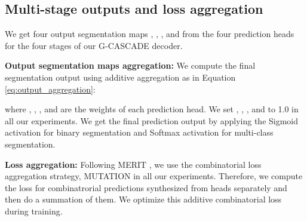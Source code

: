 \documentclass[10pt,twocolumn,letterpaper]{article}
\begin{document}
\subsection{Multi-stage outputs and loss aggregation}
We get four output segmentation maps , , , and  from the four prediction heads for the four stages of our G-CASCADE decoder. 

\textbf{Output segmentation maps aggregation:} We compute the final segmentation output using additive aggregation as in Equation \ref{eq:output_aggregation}:

where , , , and  are the weights of each prediction head. We set , , , and  to 1.0 in all our experiments. We get the final prediction output by applying the Sigmoid activation for binary segmentation and Softmax activation for multi-class segmentation. 

\textbf{Loss aggregation:} Following MERIT \cite{rahman2023multi}, we use the combinatorial loss aggregation strategy, MUTATION in all our experiments. Therefore, we compute the loss for  combinatrorial predictions synthesized from  heads separately and then do a summation of them. We optimize this additive combinatorial loss during training.
\end{document}
